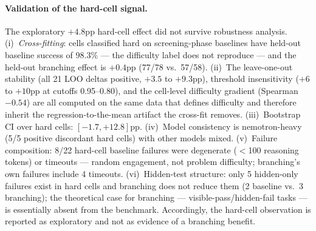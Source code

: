 \documentclass[11pt]{article}
\begin{document}
\paragraph{Validation of the hard-cell signal.} The exploratory $+4.8$pp hard-cell effect did not survive robustness
analysis. (i)~\emph{Cross-fitting}: cells
classified hard on screening-phase baselines have held-out baseline
success of 98.3\% --- the difficulty label does not reproduce --- and the
held-out branching effect is $+0.4$pp (77/78 vs.\ 57/58). (ii)~The
leave-one-out stability (all 21 LOO deltas positive, $+3.5$ to $+9.3$pp),
threshold insensitivity ($+6$ to $+10$pp at cutoffs 0.95--0.80), and the
cell-level difficulty gradient (Spearman $-0.54$) are all computed on the
same data that defines difficulty and therefore inherit the
regression-to-the-mean artifact the cross-fit removes. (iii)~Bootstrap CI
over hard cells: $[-1.7, +12.8]$pp. (iv)~Model consistency is
nemotron-heavy (5/5 positive discordant hard cells) with other models
mixed. (v)~Failure composition: 8/22 hard-cell baseline failures were
degenerate ($<$100 reasoning tokens) or timeouts --- random engagement,
not problem difficulty; branching's own failures include 4 timeouts.
(vi)~Hidden-test structure: only 5 hidden-only failures exist in hard
cells and branching does not reduce them (2 baseline vs.\ 3 branching);
the theoretical case for branching --- visible-pass/hidden-fail tasks ---
is essentially absent from the benchmark. Accordingly, the hard-cell observation is reported as exploratory and not as
evidence of a branching benefit.
\end{document}
